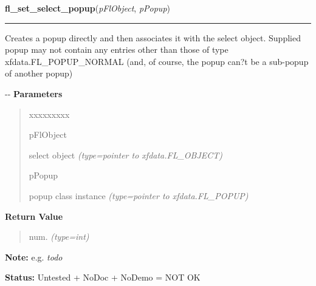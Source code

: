 \hspace{.8\funcindent}\begin{boxedminipage}{\funcwidth}

    \raggedright \textbf{fl\_set\_select\_popup}(\textit{pFlObject}, \textit{pPopup})

    \vspace{-1.5ex}

    \rule{\textwidth}{0.5\fboxrule}
\setlength{\parskip}{2ex}

Creates a popup directly and then associates it with the select object.
Supplied popup may not contain any entries other than those of type
xfdata.FL\_POPUP\_NORMAL (and, of course, the popup can?t be a sub-popup
of another popup)

-{}-
\setlength{\parskip}{1ex}
      \textbf{Parameters}
      \vspace{-1ex}

      \begin{quote}
        \begin{Ventry}{xxxxxxxxx}

          \item[pFlObject]


select object
            {\it (type=pointer to xfdata.FL\_OBJECT)}

          \item[pPopup]


popup class instance
            {\it (type=pointer to xfdata.FL\_POPUP)}

        \end{Ventry}

      \end{quote}

      \textbf{Return Value}
    \vspace{-1ex}

      \begin{quote}

num.
      {\it (type=int)}

      \end{quote}

\textbf{Note:} 
e.g. \emph{todo}


\textbf{Status:} 
Untested + NoDoc + NoDemo = NOT OK


    \end{boxedminipage}

    \label{xformslib:flselect:fl_get_select_item}

